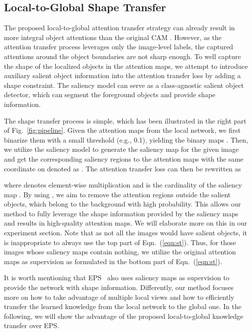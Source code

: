 \documentclass[10pt,twocolumn,letterpaper]{article}
\newcommand{\figref}[1]{Fig.~\ref{#1}}
\newcommand{\eqnref}[1]{Eqn.~(\ref{#1})}
\begin{document}
\subsection{Local-to-Global Shape Transfer} \label{sec:st}
The proposed local-to-global attention transfer strategy can already
result in more integral object attentions than the original
CAM \cite{zhou2016learning}.
However, as the attention transfer process leverages only the image-level
labels, the captured attentions around the object boundaries 
are not sharp enough.
To well capture the shape of the localized objects in the attention maps, 
we attempt to introduce auxiliary salient object information
into the attention transfer loss by adding a shape constraint.
The saliency model \cite{liu2019simple} 
can serve as a class-agnostic salient object detector, 
which can segment the foreground objects and provide shape information.


The shape transfer process is simple, which has been illustrated in
the right part of \figref{fig:pipeline}.
Given the attention maps  from the local network,
we first binarize them with a small threshold (e.g., 0.1), yielding the binary maps .
Then, we utilize the saliency model to generate the saliency map 
for the given image  and get the corresponding saliency regions to 
the attention maps  with the same coordinate on 
denoted as .
The attention transfer loss can then be rewritten as

where  denotes element-wise multiplication and 
 is the cardinality of the saliency map .
By using , we aim to remove the attention regions outside
the salient objects, which belong to the background with high probability. 
This allows our method to fully leverage the shape information provided
by the saliency maps and results in high-quality attention maps.
We will elaborate more on this in our experiment section.
Note that as not all the images would have salient objects,
it is inappropriate to always use the top part of \eqnref{eqn:st}.
Thus, for those images whose saliency maps contain nothing,
we utilize the original attention maps as supervision as formulated in
the bottom part of \eqnref{eqn:st}.

It is worth mentioning that EPS~\cite{lee2021railroad} also uses
saliency maps as supervision to provide the network with shape
information.
Differently, our method focuses more on how to take advantage of
multiple local views and how to efficiently transfer the learned knowledge
from the local network to the global one.
In the following, we will show the advantage of the
proposed local-to-global knowledge transfer over EPS.
\end{document}
